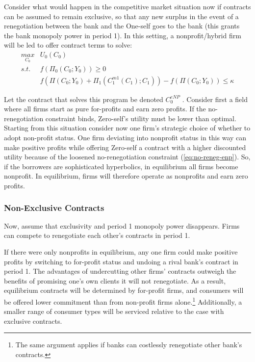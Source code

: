 \documentclass[11pt,english]{article}
\theoremstyle{plain}
\theoremstyle{definition}
\begin{document}
Consider what would happen in the competitive market situation now
if contracts can be assumed to remain exclusive, so that any new surplus
in the event of a renegotiation between the bank and the One-self
goes to the bank (this grants the bank monopoly power in period 1).
In this setting, a nonprofit/hybrid firm will be led to offer contract
terms to solve:
\begin{align}
\underset{C_{0}}{max} & U_{0}\left(C_{0}\right)\\
s.t. & f\left(\Pi_{0}(C_{0};Y_{0})\right)\geq0\\
 & f\left(\Pi\left(C_{0};Y_{0}\right)+\Pi_{1}\left(C_{1}^{m1}\left(C_{1}\right);C_{1}\right)\right)-f\left(\Pi\left(C_{0};Y_{0}\right)\right)\leq\kappa\label{eq:no-reneg-enp}
\end{align}

Let the contract that solves this program be denoted $C_{0}^{eNP}$
. Consider first a field where all firms start as pure for-profits
and earn zero profits. If the no-renegotiation constraint binds, Zero-self's
utility must be lower than optimal. Starting from this situation consider
now one firm's strategic choice of whether to adopt non-profit status.
One firm deviating into nonprofit status in this way can make positive
profits while offering Zero-self a contract with a higher discounted
utility because of the loosened no-renegotiation constraint (\ref{eq:no-reneg-enp}).
So, if the borrowers are sophisticated hyperbolics, in equilibrium
all firms become nonprofit. In equilibrium, firms will therefore operate
as nonprofits and earn zero profits.

\subsubsection{Non-Exclusive Contracts}

Now, assume that exclusivity and period 1 monopoly power disappears.
Firms can compete to renegotiate each other's contracts in period
1.

If there were only nonprofits in equilibrium, any one firm could make
positive profits by switching to for-profit status and undoing a rival
bank's contract in period 1. The advantages of undercutting other
firms' contracts outweigh the benefits of promising one's own clients
it will not renegotiate. As a result, equilibrium contracts will be
determined by for-profit firms, and consumers will be offered lower
commitment than from non-profit firms alone.\footnote{The same argument applies if banks can costlessly renegotiate other
bank's contracts.} Additionally, a smaller range of consumer types will be serviced
relative to the case with exclusive contracts. 
\end{document}
